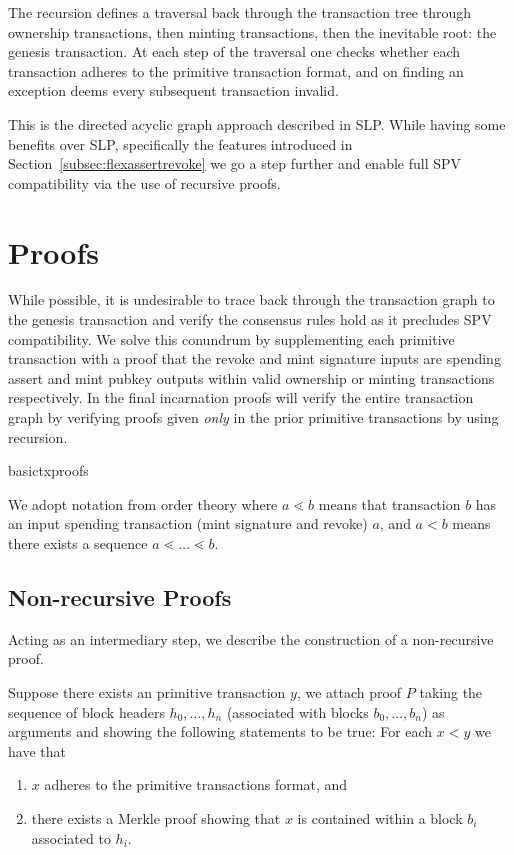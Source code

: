 \documentclass[9pt,oneside]{amsart}
\begin{document}
The recursion defines a traversal back through the transaction tree through ownership transactions, then minting transactions, then the inevitable root: the genesis transaction. At each step of the traversal one checks whether each transaction adheres to the primitive transaction format, and on finding an exception deems every subsequent transaction invalid.

This is the directed acyclic graph approach described in SLP. While having some benefits over SLP, specifically the features introduced in Section~\ref{subsec:flexassertrevoke} we go a step further and enable full SPV compatibility via the use of recursive proofs.
    
\section{Proofs}
While possible, it is undesirable to trace back through the transaction graph to the genesis transaction and verify the consensus rules hold as it precludes SPV compatibility. We solve this conundrum by supplementing each primitive transaction with a proof that the revoke and mint signature inputs are spending assert and mint pubkey outputs within valid ownership or minting transactions respectively. In the final incarnation proofs will verify the entire transaction graph by verifying proofs given \emph{only} in the prior primitive transactions by using recursion.

\begin{center}
    {basictxproofs}
\end{center}

We adopt notation from order theory where $a \lessdot b$ means that transaction $b$ has an input spending transaction (mint signature and revoke) $a$, and $a < b$ means there exists a sequence $a \lessdot \dots \lessdot b$.
\subsection{Non-recursive Proofs}
Acting as an intermediary step, we describe the construction of a non-recursive proof.


Suppose there exists an primitive transaction $y$, we attach proof $P$ taking the sequence of block headers $h_{0}, \dots, h_{n}$ (associated with blocks $b_{0}, \dots, b_{n}$) as arguments and showing the following statements to be true:
For each $x < y$ we have that
\begin{enumerate}
    \item $x$ adheres to the primitive transactions format, and
    \item there exists a Merkle proof showing that $x$ is contained within a block $b_{i}$ associated to $h_{i}$.
\end{enumerate}
\end{document}
